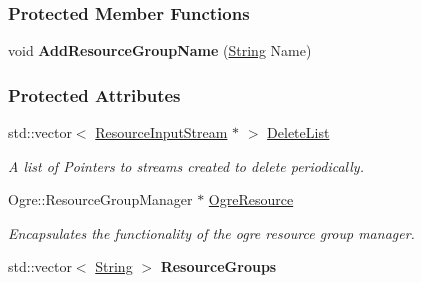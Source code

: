 \subsubsection*{Protected Member Functions}
\begin{DoxyCompactItemize}
\item 
\hypertarget{classphys_1_1ResourceManager_a7c84034fc45e64fc3a07f736230afd38}{
void {\bfseries AddResourceGroupName} (\hyperlink{namespacephys_aa03900411993de7fbfec4789bc1d392e}{String} Name)}
\label{classphys_1_1ResourceManager_a7c84034fc45e64fc3a07f736230afd38}

\end{DoxyCompactItemize}
\subsubsection*{Protected Attributes}
\begin{DoxyCompactItemize}
\item 
\hypertarget{classphys_1_1ResourceManager_a03a283e02f3639f5c1f2de915ed798ae}{
std::vector$<$ \hyperlink{classphys_1_1ResourceInputStream}{ResourceInputStream} $\ast$ $>$ \hyperlink{classphys_1_1ResourceManager_a03a283e02f3639f5c1f2de915ed798ae}{DeleteList}}
\label{classphys_1_1ResourceManager_a03a283e02f3639f5c1f2de915ed798ae}

\begin{DoxyCompactList}\small\item\em A list of Pointers to streams created to delete periodically. \item\end{DoxyCompactList}\item 
\hypertarget{classphys_1_1ResourceManager_af19bf0549a0896cf84696a39f4ca817d}{
Ogre::ResourceGroupManager $\ast$ \hyperlink{classphys_1_1ResourceManager_af19bf0549a0896cf84696a39f4ca817d}{OgreResource}}
\label{classphys_1_1ResourceManager_af19bf0549a0896cf84696a39f4ca817d}

\begin{DoxyCompactList}\small\item\em Encapsulates the functionality of the ogre resource group manager. \item\end{DoxyCompactList}\item 
\hypertarget{classphys_1_1ResourceManager_a284bc8b042fffbb607355f7874692b54}{
std::vector$<$ \hyperlink{namespacephys_aa03900411993de7fbfec4789bc1d392e}{String} $>$ {\bfseries ResourceGroups}}
\label{classphys_1_1ResourceManager_a284bc8b042fffbb607355f7874692b54}

\end{DoxyCompactItemize}


